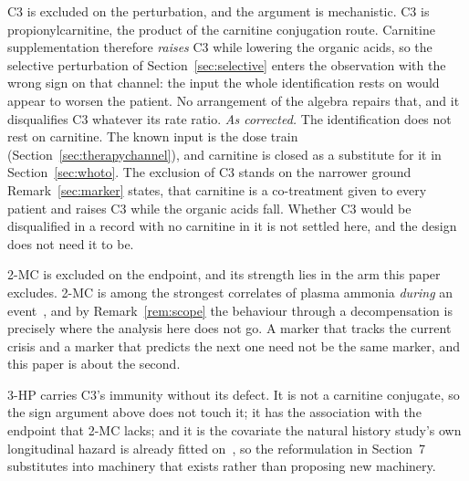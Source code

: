 C3 is excluded on the perturbation, and the argument is mechanistic. C3 is
propionylcarnitine, the product of the carnitine conjugation route. Carnitine
supplementation therefore \emph{raises} C3 while lowering the organic acids, so the
selective perturbation of Section~\ref{sec:selective} enters the observation with the wrong
sign on that channel: the input the whole identification rests on would appear to worsen the
patient. No arrangement of the algebra repairs that, and it disqualifies C3 whatever its
rate ratio. \emph{As corrected.} The identification does not rest on carnitine. The known
input is the dose train (Section~\ref{sec:therapychannel}), and carnitine is closed as a
substitute for it in Section~\ref{sec:whoto}. The exclusion of C3 stands on the narrower
ground Remark~\ref{sec:marker} states, that carnitine is a co-treatment given to every
patient and raises C3 while the organic acids fall. Whether C3 would be disqualified in a
record with no carnitine in it is not settled here, and the design does not need it to be.

2-MC is excluded on the endpoint, and its strength lies in the arm this paper
excludes. 2-MC is among the strongest correlates of plasma ammonia \emph{during} an
event~\cite{amd_phenotyping}, %
and by Remark~\ref{rem:scope} the behaviour through a decompensation is precisely where the
analysis here does not go. A marker that tracks the current crisis and a marker that
predicts the next one need not be the same marker, and this paper is about the second.

3-HP carries C3's immunity without its defect. It is not a carnitine conjugate, so
the sign argument above does not touch it; it has the association with the endpoint that
2-MC lacks; and it is the covariate the natural history study's own longitudinal hazard is
already fitted on~\cite{natural_history}, %
so the reformulation in Section~7 substitutes into machinery that exists rather than
proposing new machinery.

